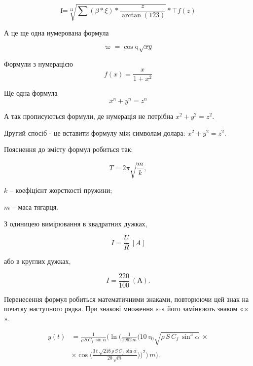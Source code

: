 \begin{equation}
	\text{f=}\sqrt[12]{\sum\left(\beta*\xi\right)*\frac{z}{\arctan(123)}}*\top f(z)
\end{equation}

А це ще одна нумерована формула

\begin{equation}
	\varpi=\cos\text{q}\sqrt{{x}{y}}
\end{equation}

Формули з нумерацією    
\begin{equation}
    f(x)=\frac{x}{1+x^2}
\end{equation}

Ще одна формула    
\begin{equation}
    x^n + y^n = z^n
\end{equation}
    
А так прописуються формули, де нумерація не потрібна \(x^2 + y^2 = z^2\).

Другий спосіб - це вставити формулу між символам долара: $x^2 + y^2 = z^2$. 

Пояснення до змісту формул робиться так:

\begin{equation}
T = 2\pi\sqrt{\frac{m}{k}}, 
\end{equation}

\begin{explanation}
\fitem $k$ -- коефіцієнт жорсткості пружини; 
\item $m$ -- маса тягарця.
\end{explanation}

З одиницею вимірювання в квадратних дужках,

\begin{equation}
\label{eq:explan}
I = \frac{U}{R}~[A]
\end{equation}

або в круглих дужках,

$$I = \frac{220}{100}~(\text{А}).$$

Перенесення формул робиться математичними знаками, повторюючи цей знак на початку наступного рядка. При знакові множення «$\cdot$» його замінюють знаком «$\times$».

\begin{align}
\label{xt:eq}
y(t) &= \frac{1}{{\rho}\,{S}\,{C_{f}}\,\sin\alpha}\Big(\ln\Big(\frac{1}{1962\,m}\Big(10\,v_0\sqrt{\rho\,S\,C_f\,\sin^3\alpha}\,\times \nonumber\\  &\times\cos\Big(\frac{3\,t\,\sqrt{218\,\rho\,S\,C_f\,\sin\alpha}}{20\,\sqrt{m}}\Big)\Big)^2\Big)\,m\Big).
\end{align}

